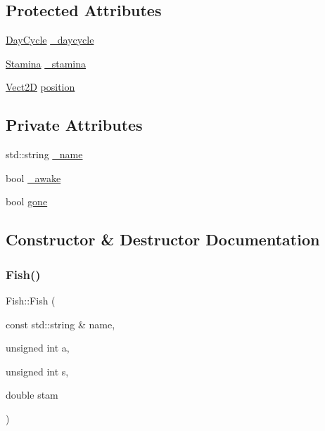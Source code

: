 \subsection*{Protected Attributes}
\begin{DoxyCompactItemize}
\item 
\hyperlink{classDayCycle}{Day\+Cycle} \hyperlink{classFish_a4b8a32e2a5165ddd1f8af27f4346b3eb_a4b8a32e2a5165ddd1f8af27f4346b3eb}{\+\_\+daycycle}
\item 
\hyperlink{classStamina}{Stamina} \hyperlink{classFish_a4948331d0f556344bda8314828eec8dd_a4948331d0f556344bda8314828eec8dd}{\+\_\+stamina}
\item 
\hyperlink{classVect2D}{Vect2D} \hyperlink{classCartesianObject2D_ae02ec6ed11f9bfc0c748da033d6a32f9_ae02ec6ed11f9bfc0c748da033d6a32f9}{position}
\end{DoxyCompactItemize}
\subsection*{Private Attributes}
\begin{DoxyCompactItemize}
\item 
std\+::string \hyperlink{classFish_a0fff903c775250b77cb079ec291863a4_a0fff903c775250b77cb079ec291863a4}{\+\_\+name}
\item 
bool \hyperlink{classFish_a9298b505c56bb0c5480a3eff0cb8542b_a9298b505c56bb0c5480a3eff0cb8542b}{\+\_\+awake}
\item 
bool \hyperlink{classFish_a7daccde048dc63b7f8c9e6be0af56fa5_a7daccde048dc63b7f8c9e6be0af56fa5}{gone}
\end{DoxyCompactItemize}


\subsection{Constructor \& Destructor Documentation}
\mbox{\label{classFish_a7f97c2f2fea7930e5c82b8e7edd382ac_a7f97c2f2fea7930e5c82b8e7edd382ac}} 
\subsubsection{\texorpdfstring{Fish()}{Fish()}}
{\footnotesize\ttfamily Fish\+::\+Fish (\begin{DoxyParamCaption}\item[{const std\+::string \&}]{name,  }\item[{unsigned int}]{a,  }\item[{unsigned int}]{s,  }\item[{double}]{stam }\end{DoxyParamCaption})}

